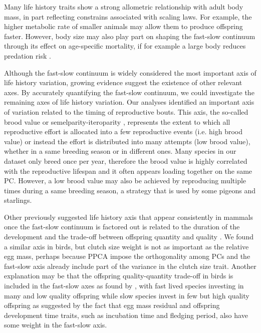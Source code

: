 Many life history traits show a strong allometric relationship with adult body
mass, in part reflecting constrains associated with scaling laws. For example, 
the higher metabolic rate of smaller animals may allow them to produce offspring 
faster. However, body size may also play part on shaping the fast-slow continuum
through its effect on age-specific mortality, if for example a large body reduces
predation risk \citep{Jeschke2009}.

Although the fast-slow continuum is widely considered the most important axis of 
life history variation, growing evidence suggest the existence of other relevant 
axes. By accurately quantifying the fast-slow continuum, we could investigate 
the remaining axes of life history variation.
Our analyses identified an important axis of variation related to the timing of
reproductive bouts. This axis, the so-called brood value \citep{Bokony2009} or
semelparity-iteroparity \citep{Gaillard1989}, represents the extent to which
all reproductive effort is allocated into a few reproductive events (i.e. high
brood value) or instead the effort is distributed into many attempts (low brood
value), whether in a same breeding season or in different ones. Many species in
our dataset only breed once per year, therefore the brood value is highly
correlated with the reproductive lifespan and it often appears loading together
on the same PC. However, a low brood value may also be achieved by reproducing
multiple times during a same breeding season, a strategy that is used by some
pigeons and starlings.

Other previously suggested life history axis that appear consistently in mammals
once the fast-slow continuum is factored out is related to the duration of the
development and the trade-off between offspring quantity and quality
\citep{Promislow1990,Bielby2007,Dobson2007}.
We found a similar axis in birds, but clutch size weight is not as important as
the relative egg mass, perhaps because PPCA impose the orthogonality among PCs
and the fast-slow axis already include part of the variance in the clutch size
trait. Another explanation may be that the offspring quality-quantity trade-off
in birds is included in the fast-slow axes as found by \citet{Jeschke2009},
with fast lived species investing in many and low quality offspring while slow
species invest in few but high quality offspring as suggested by the fact that
egg mass residual and offspring development time traits, such as incubation time
and fledging period, also have some weight in the fast-slow axis.


